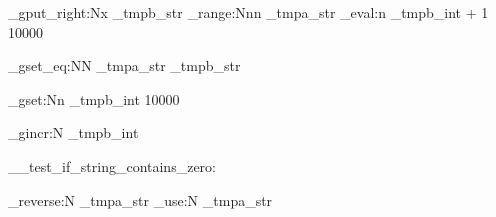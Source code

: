 {{{{{                    %
                    \str_gput_right:Nx \g_tmpb_str {
                        \str_range:Nnn \g_tmpa_str {\int_eval:n {\g_tmpb_int + 1}} {10000}
                    }

                    \str_gset_eq:NN \g_tmpa_str \g_tmpb_str

                    \int_gset:Nn \g_tmpb_int {10000}
                } {
                }
                \int_gincr:N \g_tmpb_int
            }
        }

        \__test_if_string_contains_zero:
    }

    \tl_reverse:N \g_tmpa_str
    \str_use:N \g_tmpa_str
}

\ExplSyntaxOff
